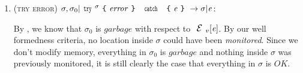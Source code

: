 \begin{enumerate}
\begin{itemize}
\end{itemize}

\item (\textsc{try error}) $\sigma,\sigma_0|\Kw{try}^\sigma\oC \mathit{error}\cC\ \Kw{catch}\ \oC\e\cC\rightarrow \sigma|\e$:

	By , we know that $\sigma_0$ is $\mathit{garbage}$ with respect to $\ctx_v[\e]$. By our well formedness criteria, no location inside $\sigma$ could have been \emph{monitored}.
	Since we don't modify memory, everything in $\sigma_0$ is $\mathit{garbage}$ and nothing inside $\sigma$ was previously monitored, it is still clearly the case that everything in $\sigma$ is $\mathit{OK}$. 
\end{enumerate}